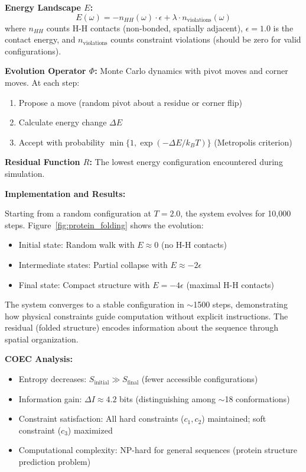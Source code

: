 \documentclass[11pt]{article}
\begin{document}
\textbf{Energy Landscape $E$:}
\begin{equation}
E(\omega) = -n_{HH}(\omega) \cdot \epsilon + \lambda \cdot n_{\text{violations}}(\omega)
\end{equation}
where $n_{HH}$ counts H-H contacts (non-bonded, spatially adjacent), $\epsilon = 1.0$ is the contact energy, and $n_{\text{violations}}$ counts constraint violations (should be zero for valid configurations).

\textbf{Evolution Operator $\Phi$:} Monte Carlo dynamics with pivot moves and corner moves. At each step:
\begin{enumerate}
\item Propose a move (random pivot about a residue or corner flip)
\item Calculate energy change $\Delta E$
\item Accept with probability $\min\{1, \exp(-\Delta E / k_B T)\}$ (Metropolis criterion)
\end{enumerate}

\textbf{Residual Function $R$:} The lowest energy configuration encountered during simulation.

\textbf{Implementation and Results:}

Starting from a random configuration at $T = 2.0$, the system evolves for 10,000 steps. Figure~\ref{fig:protein_folding} shows the evolution:

\begin{itemize}
\item Initial state: Random walk with $E \approx 0$ (no H-H contacts)
\item Intermediate states: Partial collapse with $E \approx -2\epsilon$
\item Final state: Compact structure with $E = -4\epsilon$ (maximal H-H contacts)
\end{itemize}

The system converges to a stable configuration in $\sim$1500 steps, demonstrating how physical constraints guide computation without explicit instructions. The residual (folded structure) encodes information about the sequence through spatial organization.

\textbf{COEC Analysis:}
\begin{itemize}
\item Entropy decreases: $S_{\text{initial}} \gg S_{\text{final}}$ (fewer accessible configurations)
\item Information gain: $\Delta I \approx 4.2$ bits (distinguishing among $\sim$18 conformations)
\item Constraint satisfaction: All hard constraints ($c_1, c_2$) maintained; soft constraint ($c_3$) maximized
\item Computational complexity: NP-hard for general sequences (protein structure prediction problem)
\end{itemize}
\end{document}
